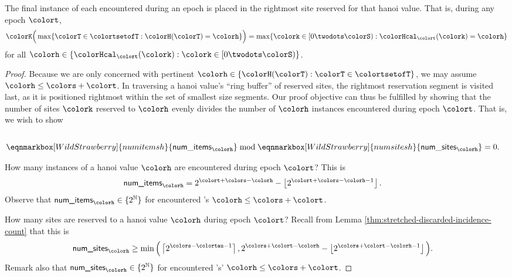 \begin{lemma}
\label{thm:tilted-last-touched}
The final instance of each \hv{} encountered during an epoch is placed in the rightmost site reserved for that hanoi value.
That is, during any epoch $\colort$,
\begin{align*}
\colorK\Big(
  \max\{\colorT \in \colortsetofT : \colorH(\colorT) = \colorh\}
\Big)
=
\max\{\colork \in [0\twodots\colorS) : \colorHcal_{\colort}(\colork) = \colorh \}
\end{align*}
for all $\colorh \in \{\colorHcal_{\colort}(\colork) : \colork \in [0\twodots\colorS)\}$.
\end{lemma}

\begin{proof}
Because we are only concerned with pertinent \hv{} $\colorh \in \{\colorH(\colorT) : \colorT \in \colortsetofT\}$, we may assume $\colorh \leq \colors + \colort$.
In traversing a hanoi value's ``ring buffer'' of reserved sites, the rightmost reservation segment is visited last, as it is positioned rightmost within the set of smallest size segments.
Our proof objective can thus be fulfilled by showing that the number of sites $\colork$ reserved to \hv{} $\colorh$ evenly divides the number of \hv{} $\colorh$ instances encountered during epoch $\colort$.
That is, we wish to show
\begin{align*}
\\
\eqnmarkbox[WildStrawberry]{numitemsh}{
  \mathsf{num\_items}_{\colorh}
}
\bmod
\eqnmarkbox[WildStrawberry]{numsitesh}{
  \mathsf{num\_sites}_{\colorh}
}
&= 0.
\end{align*}

\annotate[yshift=1em]{above,right}{numsitesh}{$|\{
  \colork \in [0\twodots\colorS) : \colorHcal_{\colort}(\colork) = \colorh
\}|$}

How many instances of a hanoi value $\colorh$ are encountered during epoch $\colort$?
This is
\begin{align*}
\textsf{num\_items}_{\colorh}
&=
2^{\colort + \colors - \colorh} - \left\lfloor2^{\colort + \colors - \colorh - 1} \right\rfloor.
\end{align*}
Observe that $\textsf{num\_items}_{\colorh} \in \{2^{\mathbb{N}}\}$ for encountered \hv{}'s $\colorh \leq \colors + \colort$.

How many sites are reserved to a hanoi value $\colorh$ during epoch $\colort$?
Recall from Lemma \ref{thm:stretched-discarded-incidence-count} that this is
\begin{align*}
\textsf{num\_sites}_{\colorh}
&\geq
\min\Big(
\left\lceil 2^{\colors - \colortau - 1} \right\rceil,
2^{\colors + \colort - \colorh} - \left\lfloor 2^{\colors + \colort - \colorh - 1} \right\rfloor
\Big).
\end{align*}
Remark also that $\textsf{num\_sites}_{\colorh} \in \{2^{\mathbb{N}}\}$ for encountered \hv{}'s' $\colorh \leq \colors + \colort$.


\end{proof}
